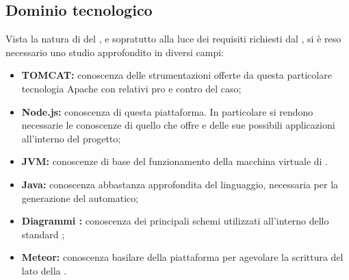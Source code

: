   \subsection{Dominio tecnologico}
    Vista la natura di  del , e sopratutto alla luce dei requisiti richiesti dal , si è reso necessario uno studio approfondito in diversi campi:
      \begin{itemize}
        \item \textbf{ TOMCAT:}  conoscenza delle strumentazioni offerte da questa particolare tecnologia Apache con relativi pro e contro del caso;
        \item \textbf{Node.js:} conoscenza di questa piattaforma. In particolare si rendono necessarie le conoscenze di quello che offre e delle sue possibili applicazioni
        all'interno del progetto;
        \item \textbf{JVM:} conoscenze di base del funzionamento della macchina virtuale di .
        \item \textbf{Java:} conoscenza abbastanza approfondita del linguaggio, necessaria per la generazione del  automatico;
        \item \textbf{Diagrammi :} conoscenza dei principali schemi utilizzati all'interno dello standard ;
        \item \textbf{Meteor:} conoscenza basilare della piattaforma per agevolare la scrittura del lato  della .
      \end{itemize}
